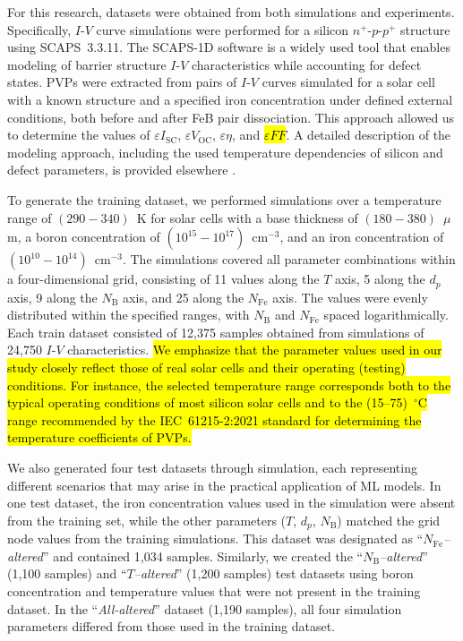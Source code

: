 \documentclass[a4paper,fleqn,draft]{cas-sc}
\begin{document}
For this research, datasets were obtained from both simulations and experiments.
Specifically, $I$-$V$ curve simulations were performed for a silicon $n^+$-$p$-$p^+$ structure using SCAPS~3.3.11.
The SCAPS-1D software \cite{SCAPS1} is a widely used tool
\cite{MasumMia2025, Joshi2024, Ravidas2024, Liu2024, You2023, SCAPSDefect3}
that enables modeling of barrier structure $I$-$V$ characteristics while accounting for defect states.
PVPs were extracted from pairs of $I$-$V$ curves simulated for a solar cell with a known structure
and a specified iron concentration under defined external conditions, both before and after FeB pair dissociation.
This approach allowed us to determine the values of $\varepsilon I_\mathrm{SC}$, $\varepsilon V_\mathrm{OC}$, $\varepsilon \eta$, and
\textcolor[rgb]{1.00,0.07,0.00}{\hl{$\varepsilon F\!F$}}.
A detailed description of the modeling approach, including the used temperature dependencies of silicon and defect parameters,
is provided elsewhere \cite{Olikh2019SM, Olikh2025MSEB}.


To generate the training dataset, we performed simulations over a temperature range of $(290-340)$~K
for solar cells with a base thickness of $(180-380)$~$\mu$m,
a boron concentration of $(10^{15} - 10^{17})$~cm$^{-3}$, and an iron concentration of $(10^{10}-10^{14})$~cm$^{-3}$.
The simulations covered all parameter combinations within a four-dimensional grid, consisting of 11 values along the $T$ axis,
5 along the $d_p$ axis,
9 along the $N_\mathrm{B}$ axis, and 25 along the $N_\mathrm{Fe}$ axis.
The values were evenly distributed within the specified ranges, with $N_\mathrm{B}$ and $N_\mathrm{Fe}$ spaced logarithmically.
Each train dataset consisted of 12,375 samples obtained from simulations of 24,750 $I$-$V$ characteristics.
\textcolor[rgb]{1.00,0.07,0.00}{
\hl{
We emphasize that the parameter values used in our study closely reflect those of real solar cells
and their operating (testing) conditions.
For instance, the selected temperature range corresponds both to the typical operating conditions of most silicon solar cells
and to the (15--75)~$^\circ$C range recommended by the IEC~61215-2:2021 standard for determining the temperature coefficients of PVPs.
}}

We also generated four test datasets through simulation,
each representing different scenarios that may arise in the practical application of ML models.
In one test dataset, the iron concentration values used in the simulation were absent from the training set,
while the other parameters ($T$, $d_p$, $N_\mathrm{B}$) matched the grid node values from the training simulations.
This dataset was designated as ``\textit{$N_\mathrm{Fe}$--altered}'' and contained 1,034 samples.
Similarly, we created the ``\textit{$N_\mathrm{B}$--altered}'' (1,100 samples) and ``\textit{$T$--altered}'' (1,200 samples)
test datasets using boron concentration and temperature values that were not present in the training dataset.
In the ``\textit{All-altered}'' dataset (1,190 samples), all four simulation parameters differed from those used in the training dataset.
\end{document}
